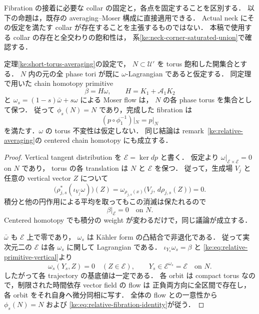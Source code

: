 Fibration の接着に必要な collar の固定と，各点を固定することを区別する．
以下の命題は，既存の averaging--Moser 構成に直接適用できる．
Actual neck にその仮定を満たす collar が存在することを主張するものではない．
本稿で使用する collar の存在と全交わりの飽和性は，
系\ref{ke:neck-corner-saturated-union}で確認する．

\begin{proposition}
\label{ke:relative-fiber-preserving}
定理\ref{ke:short-torus-averaging}の設定で，
$N\subset\mathcal U'$ を torus 飽和した開集合とする．
$N$ 内の元の全 phase tori が既に $\omega$-Lagrangian であると仮定する．
同定理で用いた chain homotopy primitive
\[
 \beta=H\omega,
 \qquad H=K_1+\mathcal A_1K_2
\]
と $\omega_s=(1-s)\bar\omega+s\omega$ による Moser flow は，
$N$ の各 phase torus を集合として保つ．
従って $\phi_s(N)=N$ であり，完成した fibration は
\begin{equation}\label{ke:eq:relative-fibration-identity}
 (p\circ\phi_1^{-1})|_N=p|_N
\end{equation}
を満たす．$\omega$ の torus 不変性は仮定しない．
同じ結論は remark~\ref{ke:relative-averaging}の centered chain homotopy にも成立する．
\end{proposition}
\begin{proof}
Vertical tangent distribution を $\mathcal E=\ker dp$ と書く．
仮定より $\omega|_{\mathcal E\times\mathcal E}=0$ on $N$ であり，
torus の各 translation は $N$ と $\mathcal E$ を保つ．
従って，生成場 $V_j$ と任意の vertical vector $Z$ について
\[
 \bigl(\rho_{j,s}^*(\iota_{V_j}\omega)\bigr)(Z)
 =\omega_{\rho_{j,s}(x)}
     \bigl(V_j,\,d\rho_{j,s}(Z)\bigr)=0.
\]
積分と他の円作用による平均を取ってもこの消滅は保たれるので
\begin{equation}\label{ke:eq:relative-primitive-vertical}
 \beta|_{\mathcal E}=0\quad\text{on }N.
\end{equation}
Centered homotopy でも積分の weight が変わるだけで，同じ議論が成立する．

$\bar\omega$ も $\mathcal E$ 上で零であり，
$\omega_s$ は K\"ahler form の凸結合で非退化である．
従って実次元二の $\mathcal E$ は各 $\omega_s$ に関して Lagrangian である．
$\iota_{Y_s}\omega_s=\beta$ と
\eqref{ke:eq:relative-primitive-vertical}より
\[
 \omega_s(Y_s,Z)=0\quad(Z\in\mathcal E),
 \qquad Y_s\in\mathcal E^{\omega_s}=\mathcal E
 \quad\text{on }N.
\]
したがって各 trajectory の基底値は一定である．
各 orbit は compact torus なので，制限された時間依存 vector field の flow は
正負両方向に全区間で存在し，各 orbit をそれ自身へ微分同相に写す．
全体の flow との一意性から $\phi_s(N)=N$ および
\eqref{ke:eq:relative-fibration-identity}が従う．
\end{proof}

